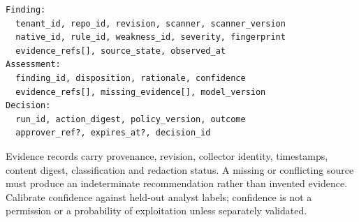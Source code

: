\documentclass[11pt,letterpaper]{article}
\begin{document}
\begin{verbatim}
Finding:
  tenant_id, repo_id, revision, scanner, scanner_version
  native_id, rule_id, weakness_id, severity, fingerprint
  evidence_refs[], source_state, observed_at
Assessment:
  finding_id, disposition, rationale, confidence
  evidence_refs[], missing_evidence[], model_version
Decision:
  run_id, action_digest, policy_version, outcome
  approver_ref?, expires_at?, decision_id
\end{verbatim}
Evidence records carry provenance, revision, collector identity, timestamps, content digest, classification and redaction status. A missing or conflicting source must produce an indeterminate recommendation rather than invented evidence. Calibrate confidence against held-out analyst labels; confidence is not a permission or a probability of exploitation unless separately validated.
\end{document}
